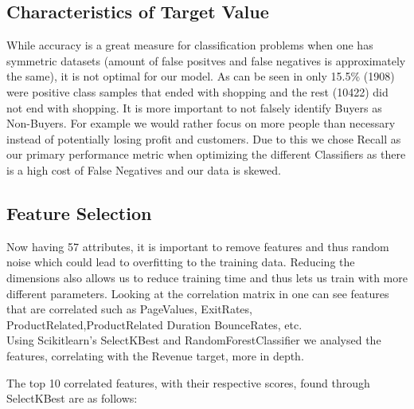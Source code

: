 \subsection{Characteristics of Target Value}
While accuracy is a great measure for classification problems when one has symmetric datasets (amount of false positves and false negatives is approximately the same), it is not optimal for our model.
As can be seen in  only 15.5\% (1908) were positive class samples that ended with shopping and the rest (10422) did not end with shopping. It is more important to not falsely identify Buyers as Non-Buyers. For example we would rather focus on more people than necessary instead of potentially losing profit and customers. Due to this we chose Recall as our primary performance metric when optimizing the different Classifiers as there is a high cost of False Negatives and our data is skewed.

\subsection{Feature Selection}
Now having 57 attributes, it is important to remove features and thus random noise which could lead to overfitting to the training data. Reducing the dimensions also allows us to reduce training time and thus lets us train with more different parameters. Looking at the correlation matrix in  one can see features that are correlated such as PageValues, ExitRates, ProductRelated,ProductRelated Duration BounceRates, etc.
 \\
\newline
Using Scikitlearn's SelectKBest and RandomForestClassifier we analysed the features, correlating with the Revenue target, more in depth. \\
\newline

The top 10 correlated features, with their respective scores, found through SelectKBest are as follows:


